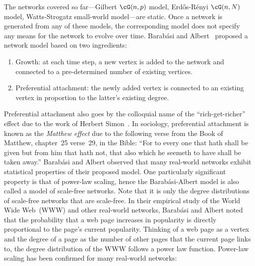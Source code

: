 The networks covered so far---Gilbert $\cG(n,p)$ model,
Erd\H{o}s-R\'enyi $\cG(n,N)$ model, Watts-Strogatz small-world
model---are static. Once a network is generated from any of these
models, the corresponding model does not specify any means for the
network to evolve over time. Barab\'asi and
Albert~\cite{BarabasiAlbert1999} proposed a network model based on two
ingredients:
\begin{enumerate}
\item Growth: at each time step, a new vertex is added to the network
  and connected to a pre-determined number of existing vertices.

\item Preferential attachment: the
  newly added vertex is connected to an existing vertex in proportion
  to the latter's existing degree.
\end{enumerate}
Preferential attachment also goes by
the colloquial name of the
``rich-get-richer'' effect due to the
work of Herbert Simon~\cite{Simon1955}. In
sociology, preferential attachment is known as the
\emph{Matthew effect} due to the following verse
from the Book of Matthew, chapter~25 verse~29, in the Bible: ``For to
every one that hath shall be given but from him that hath not, that
also which he seemeth to have shall be taken away.'' Barab\'asi and
Albert observed that many real-world networks exhibit statistical
properties of their proposed model. One particularly significant
property is that of power-law scaling, hence the
Barab\'asi-Albert model is also called
a model of scale-free networks. Note that it is only the degree
distributions of scale-free networks that are scale-free. In their
empirical study of the World Wide Web~(WWW) and
other real-world networks, Barab\'asi and Albert noted that the
probability that a web page increases in popularity is directly
proportional to the page's current popularity. Thinking of a web page
as a vertex and the degree of a page as the number of other pages that
the current page links to, the degree distribution of the WWW follows
a power law function. Power-law scaling has been confirmed for many
real-world
networks:
